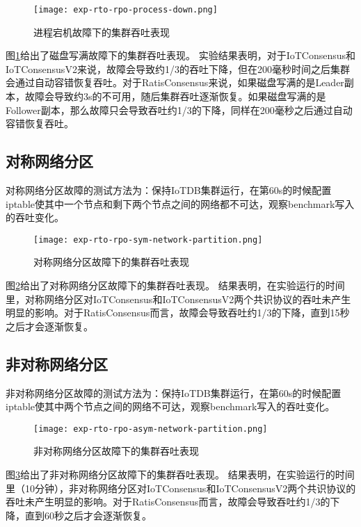 \begin{figure}
    \centering
    \texttt{[image: exp-rto-rpo-process-down.png]}
    \caption{进程宕机故障下的集群吞吐表现}
    \label{fig:exp-rto-rpo-process-down}
\end{figure}

图\ref{fig:exp-rto-rpo-process-down}给出了磁盘写满故障下的集群吞吐表现。
实验结果表明，对于IoTConsensus和IoTConsensusV2来说，故障会导致约1/3的吞吐下降，但在200毫秒时间之后集群会通过自动容错恢复吞吐。对于RatisConsensus来说，如果磁盘写满的是Leader副本，故障会导致约3s的不可用，随后集群吞吐逐渐恢复。如果磁盘写满的是Follower副本，那么故障只会导致吞吐约1/3的下降，同样在200毫秒之后通过自动容错恢复吞吐。


\subsection{对称网络分区}
对称网络分区故障的测试方法为：保持IoTDB集群运行，在第60s的时候配置iptable使其中一个节点和剩下两个节点之间的网络都不可达，观察benchmark写入的吞吐变化。


\begin{figure}
    \centering
    \texttt{[image: exp-rto-rpo-sym-network-partition.png]}
    \caption{对称网络分区故障下的集群吞吐表现}
    \label{fig:exp-rto-rpo-sym-network-partition}
\end{figure}

图\ref{fig:exp-rto-rpo-sym-network-partition}给出了对称网络分区故障下的集群吞吐表现。
结果表明，在实验运行的时间里，对称网络分区对IoTConsensus和IoTConsensusV2两个共识协议的吞吐未产生明显的影响。对于RatisConsensus而言，故障会导致吞吐约1/3的下降，直到15秒之后才会逐渐恢复。

\subsection{非对称网络分区}

非对称网络分区故障的测试方法为：保持IoTDB集群运行，在第60s的时候配置iptable使其中两个节点之间的网络不可达，观察benchmark写入的吞吐变化。


\begin{figure}
    \centering
    \texttt{[image: exp-rto-rpo-asym-network-partition.png]}
    \caption{非对称网络分区故障下的集群吞吐表现}
    \label{fig:exp-rto-rpo-asym-network-partition}
\end{figure}

图\ref{fig:exp-rto-rpo-asym-network-partition}给出了非对称网络分区故障下的集群吞吐表现。
结果表明，在实验运行的时间里（10分钟），非对称网络分区对IoTConsensus和IoTConsensusV2两个共识协议的吞吐未产生明显的影响。对于RatisConsensus而言，故障会导致吞吐约1/3的下降，直到60秒之后才会逐渐恢复。

